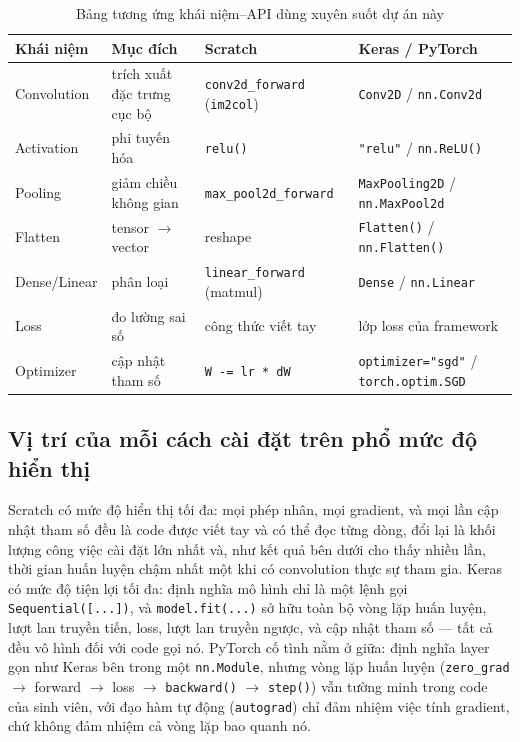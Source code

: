 \documentclass[11pt]{article}
\newcommand{\code}[1]{\texttt{#1}}
\begin{document}
\begin{table}[H]
\centering
\caption{Bảng tương ứng khái niệm–API dùng xuyên suốt dự án này}
\label{tab:concept-api}
\small
\begin{tabular}{@{}p{2.3cm}p{3.4cm}p{3.7cm}p{3.7cm}@{}}
\toprule
Khái niệm & Mục đích & Scratch & Keras / PyTorch \\
\midrule
Convolution & trích xuất đặc trưng cục bộ & \code{conv2d\_forward} (\code{im2col}) & \code{Conv2D} / \code{nn.Conv2d} \\
Activation & phi tuyến hóa & \code{relu()} & \code{"relu"} / \code{nn.ReLU()} \\
Pooling & giảm chiều không gian & \code{max\_pool2d\_forward} & \code{MaxPooling2D} / \code{nn.MaxPool2d} \\
Flatten & tensor $\to$ vector & reshape & \code{Flatten()} / \code{nn.Flatten()} \\
Dense/Linear & phân loại & \code{linear\_forward} (matmul) & \code{Dense} / \code{nn.Linear} \\
Loss & đo lường sai số & công thức viết tay & lớp loss của framework \\
Optimizer & cập nhật tham số & \code{W -= lr * dW} & \code{optimizer="sgd"} / \code{torch.optim.SGD} \\
\bottomrule
\end{tabular}
\end{table}

\subsection{Vị trí của mỗi cách cài đặt trên phổ mức độ hiển thị}

Scratch có mức độ hiển thị tối đa: mọi phép nhân, mọi gradient, và mọi lần
cập nhật tham số đều là code được viết tay và có thể đọc từng dòng, đổi lại
là khối lượng công việc cài đặt lớn nhất và, như kết quả bên dưới cho thấy
nhiều lần, thời gian huấn luyện chậm nhất một khi có convolution thực sự
tham gia. Keras có mức độ tiện lợi tối đa: định nghĩa mô hình chỉ là một
lệnh gọi \code{Sequential([...])}, và \code{model.fit(...)} sở hữu toàn bộ
vòng lặp huấn luyện, lượt lan truyền tiến, loss, lượt lan truyền ngược, và
cập nhật tham số — tất cả đều vô hình đối với code gọi nó. PyTorch cố tình
nằm ở giữa: định nghĩa layer gọn như Keras bên trong một \code{nn.Module},
nhưng vòng lặp huấn luyện (\code{zero\_grad} $\to$ forward $\to$ loss
$\to$ \code{backward()} $\to$ \code{step()}) vẫn tường minh trong code của
sinh viên, với đạo hàm tự động (\code{autograd}) chỉ đảm nhiệm việc tính
gradient, chứ không đảm nhiệm cả vòng lặp bao quanh nó.
\end{document}

